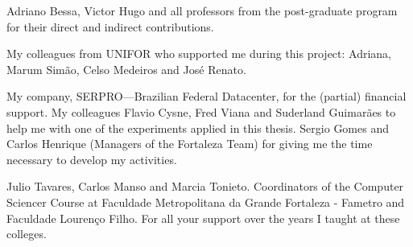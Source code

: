 Adriano Bessa, Victor Hugo and all professors from the post-graduate program for their direct and indirect contributions.

My colleagues from UNIFOR who supported me during this project: Adriana, Marum Simão, Celso Medeiros and José Renato. 

My company, SERPRO—Brazilian Federal Datacenter, for the (partial) financial support. My colleagues Flavio Cysne, Fred Viana and Suderland Guimarães to help me with one of the experiments applied in this thesis. Sergio Gomes and Carlos Henrique (Managers of the Fortaleza Team) for giving me the time necessary to develop my activities.

Julio Tavares, Carlos Manso and Marcia Tonieto. Coordinators of the Computer Sciencer Course at
Faculdade Metropolitana da Grande Fortaleza - Fametro and Faculdade Lourenço Filho. For all your support over the years I taught at these colleges.

